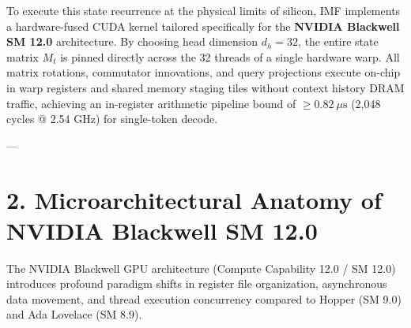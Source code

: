\documentclass[11pt,twoside,openright]{amsbook}
\begin{document}
{{{{{{To execute this state recurrence at the physical limits of silicon, IMF implements a hardware-fused CUDA kernel tailored specifically for the \textbf{NVIDIA Blackwell SM 12.0} architecture. By choosing head dimension $d_h = 32$, the entire state matrix $M_t$ is pinned directly across the 32 threads of a single hardware warp. All matrix rotations, commutator innovations, and query projections execute on-chip in warp registers and shared memory staging tiles without context history DRAM traffic, achieving an in-register arithmetic pipeline bound of $\ge 0.82\ \mu\text{s}$ (2,048 cycles @ 2.54 GHz) for single-token decode.

---

\section{2. Microarchitectural Anatomy of NVIDIA Blackwell SM 12.0}

The NVIDIA Blackwell GPU architecture (Compute Capability 12.0 / SM 12.0) introduces profound paradigm shifts in register file organization, asynchronous data movement, and thread execution concurrency compared to Hopper (SM 9.0) and Ada Lovelace (SM 8.9).

}}}}}}
\end{document}
